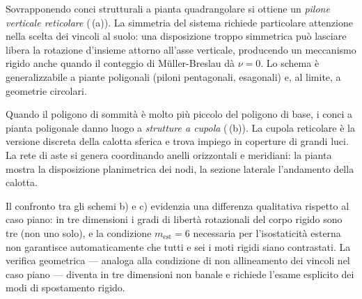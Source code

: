 









Sovrapponendo conci strutturali a pianta
quadrangolare si ottiene un \emph{pilone verticale
	reticolare} (\,(a)).
La simmetria del sistema richiede particolare
attenzione nella scelta dei vincoli al suolo:
una disposizione troppo simmetrica può lasciare
libera la rotazione d'insieme attorno all'asse
verticale, producendo un meccanismo rigido anche
quando il conteggio di M\"{u}ller-Breslau dà $\nu = 0$.
Lo schema è generalizzabile a piante poligonali
(piloni pentagonali, esagonali) e, al limite, a
geometrie circolari.

Quando il poligono di sommità è molto più piccolo
del poligono di base, i conci a pianta poligonale
danno luogo a \emph{strutture a cupola}
(\,(b)). La cupola
reticolare è la versione discreta della calotta
sferica e trova impiego in coperture di grandi
luci. La rete di aste si genera coordinando anelli
orizzontali e meridiani: la pianta mostra la
disposizione planimetrica dei nodi, la sezione
laterale l'andamento della calotta.



\begin{oss}
	Il confronto tra gli schemi b) e c) evidenzia
	una differenza qualitativa rispetto al caso
	piano: in tre dimensioni i gradi di libertà
	rotazionali del corpo rigido sono tre
	(non uno solo), e la condizione $m_{\text{est}} = 6$
	necessaria per l'isostaticità esterna non
	garantisce automaticamente che tutti e sei i
	moti rigidi siano contrastati. La verifica
	geometrica --- analoga alla condizione di
	non allineamento dei vincoli nel caso piano ---
	diventa in tre dimensioni non banale e
	richiede l'esame esplicito dei modi di
	spostamento rigido.
\end{oss}



